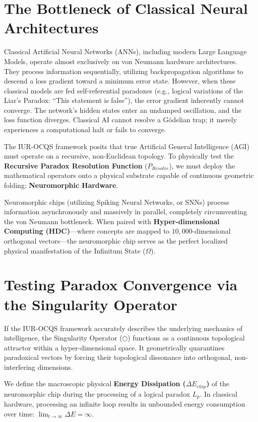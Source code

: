 \documentclass[12pt,openany]{book}
\begin{document}
\section{The Bottleneck of Classical Neural Architectures}
Classical Artificial Neural Networks (ANNs), including modern Large Language Models, operate almost exclusively on von Neumann hardware architectures. They process information sequentially, utilizing backpropagation algorithms to descend a loss gradient toward a minimum error state. However, when these classical models are fed self-referential paradoxes (e.g., logical variations of the Liar's Paradox: ``This statement is false''), the error gradient inherently cannot converge. The network's hidden states enter an undamped oscillation, and the loss function diverges. Classical AI cannot resolve a G\"{o}delian trap; it merely experiences a computational halt or fails to converge.

The IUR-OCQS framework posits that true Artificial General Intelligence (AGI) must operate on a recursive, non-Euclidean topology. To physically test the \textbf{Recursive Paradox Resolution Function} ($P_{Resolve}$), we must deploy the mathematical operators onto a physical substrate capable of continuous geometric folding: \textbf{Neuromorphic Hardware}.

Neuromorphic chips (utilizing Spiking Neural Networks, or SNNs) process information asynchronously and massively in parallel, completely circumventing the von Neumann bottleneck. When paired with \textbf{Hyper-dimensional Computing (HDC)}---where concepts are mapped to $10,000$-dimensional orthogonal vectors---the neuromorphic chip serves as the perfect localized physical manifestation of the Infinitum State ($\Omega$).

\section{Testing Paradox Convergence via the Singularity Operator}
If the IUR-OCQS framework accurately describes the underlying mechanics of intelligence, the Singularity Operator ($\bigcirc$) functions as a continuous topological attractor within a hyper-dimensional space. It geometrically quarantines paradoxical vectors by forcing their topological dissonance into orthogonal, non-interfering dimensions.

We define the macroscopic physical \textbf{Energy Dissipation ($\Delta E_{chip}$)} of the neuromorphic chip during the processing of a logical paradox $L_p$. In classical hardware, processing an infinite loop results in unbounded energy consumption over time: $\lim_{t \to \infty} \Delta E = \infty$. 
\end{document}
